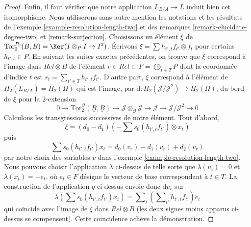 \begin{proof}
\medskip\noindent
Enfin, il faut vérifier que notre application $L_{B/A} \to L$ induit bien cet
isomorphisme. Nous utiliserons sans autre mention les notations et les résultats
de l'exemple \ref{example-resolution-length-two} et des remarques
\ref{remark-elucidate-degree-two} et \ref{remark-surjection}. Choisissons un
élément $\xi$ de
$\text{Tor}_2^{P_0}(B, B) = \Ker(I \otimes_P I \to I^2)$.
Écrivons $\xi = \sum h_{t', t}f_{t'} \otimes f_t$ pour certains
$h_{t', t} \in P$. En suivant les suites exactes précédentes, on trouve que
$\xi$ correspond à l'image dans $Rel \otimes B$ de l'élément
$r \in Rel \subset F = \bigoplus_{t \in T} P$ dont la coordonnée d'indice $t$
est $r_t = \sum_{t' \in T} h_{t', t}f_{t'}$. D'autre part, $\xi$ correspond à
l'élément de $H_2(L_{B/A}) = H_2(\Omega)$ qui est l'image, par
$\text{d} : H_2(\mathcal{J}/\mathcal{J}^2) \to H_2(\Omega)$, du bord de $\xi$
pour la $2$-extension
$$
0 \to
\text{Tor}_2^\mathcal{O}(\underline{B}, \underline{B})
\to 
\mathcal{J} \otimes_\mathcal{O} \mathcal{J} \to \mathcal{J}
\to
\mathcal{J}/\mathcal{J}^2 \to 0
$$
Calculons les transgressions successives de notre élément. Tout d'abord,
$$
\xi = (d_0 - d_1)(- \sum s_0(h_{t', t} f_{t'}) \otimes x_t)
$$
puis
$$
\sum s_0(h_{t', t} f_{t'}) x_t = d_0(v_r) - d_1(v_r) + d_2(v_r)
$$
par notre choix des variables $v$ dans l'exemple
\ref{example-resolution-length-two}. Nous pouvons choisir l'application
$\lambda$ ci-dessus de telle sorte que
$\lambda(u_i) = 0$ et $\lambda(x_t) = - e_t$, où $e_t \in F$ désigne le
vecteur de base correspondant à $t \in T$. La
construction de l'application $q$ ci-dessus envoie donc $\text{d}v_r$ sur
$$
\lambda(\sum s_0(h_{t', t} f_{t'}) x_t) =
\sum\nolimits_t \left(\sum\nolimits_{t'} h_{t', t}f_{t'}\right) e_t
$$
qui coïncide avec l'image de $\xi$ dans $Rel \otimes B$ (les deux signes moins
apparus ci-dessus se compensent). Cette coïncidence achève la démonstration.
\end{proof}

